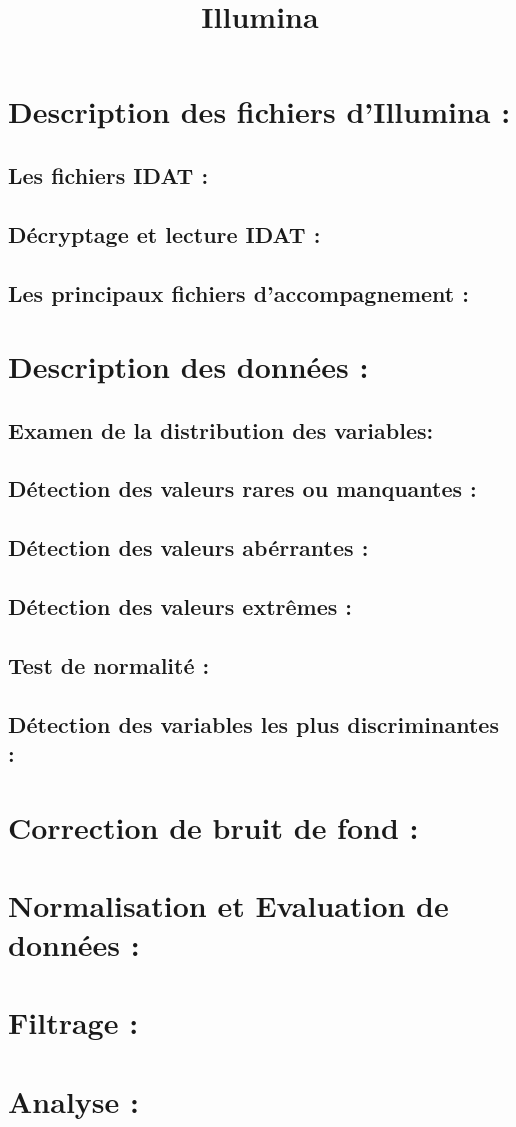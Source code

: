 \documentclass[a4paper,10pt]{article}
\title{Illumina}
\author{}
\begin{document}
\maketitle

\begin{abstract}

\end{abstract}

\section{Description des fichiers d'Illumina :}
\subsection{Les fichiers IDAT :}
\subsection{Décryptage et lecture IDAT :}
\subsection{Les principaux fichiers d'accompagnement :}
\section{Description des données :}
\subsection{Examen de la distribution des variables:}
\subsection{Détection des valeurs rares ou manquantes :}
\subsection{Détection des valeurs abérrantes :}
\subsection{Détection des valeurs extrêmes :}
\subsection{Test de normalité :}
\subsection{Détection des variables les plus discriminantes :}
\section{Correction de bruit de fond :}
\section{Normalisation et Evaluation de données :}
\section{Filtrage :}
\section{Analyse :}
\end{document}
